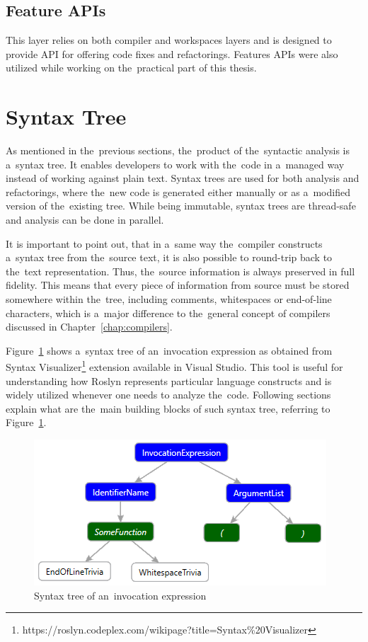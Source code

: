 \documentclass[
  digital, %
  table,   %
  lof,     %
  lot,     %
  oneside,
]{fithesis3}
\begin{document}
\subsection{Feature APIs}
This layer relies on both compiler and workspaces layers and is designed to provide API for offering code fixes and refactorings. Features APIs were also utilized while working on the~practical part of this thesis.
  
\section{Syntax Tree}
As mentioned in the~previous sections, the~product of the~syntactic analysis is a~syntax tree. It enables developers to work with the~code in a~managed way instead of working against plain text. Syntax trees are used for both analysis and refactorings, where the~new code is generated either manually or as a~modified version of the~existing tree. While being immutable, syntax trees are thread-safe and analysis can be done in parallel.

It is important to point out, that in a~same way the~compiler constructs a~syntax tree from the~source text, it is also possible to round-trip back to the~text representation. Thus, the~source information is always preserved in full fidelity. This means that every piece of information from source must be stored somewhere within the~tree, including comments, whitespaces or end-of-line characters, which is a~major difference to the~general concept of compilers discussed in Chapter~\ref{chap:compilers}.

Figure~\ref{fig:roslyn-syntax-tree} shows a~syntax tree of an~invocation expression as obtained from Syntax Visualizer\footnote{https://roslyn.codeplex.com/wikipage?title=Syntax\%20Visualizer} extension available in Visual Studio. This tool is useful for understanding how Roslyn represents particular language constructs and is widely utilized whenever one needs to analyze the~code. Following sections explain what are the~main building blocks of such syntax tree, referring to Figure~\ref{fig:roslyn-syntax-tree}.

\begin{figure}[h!]
		\centering
			\includegraphics[scale=0.8]{img/roslyn-syntax-tree-2}
		\caption{Syntax tree of an~invocation expression}
		\label{fig:roslyn-syntax-tree}
\end{figure}
\end{document}
